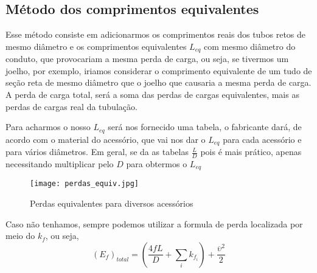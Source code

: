 \subsection{Método dos comprimentos equivalentes}
Esse método consiste em adicionarmos os comprimentos reais dos tubos retos de mesmo diâmetro e os
comprimentos equivalentes \(L_{eq} \) com mesmo diâmetro do conduto, que provocariam a mesma perda
de carga, ou seja, se tivermos um joelho, por exemplo, iriamos considerar o comprimento equivalente
de um tudo de seção reta de mesmo diâmetro que o joelho que causaria a mesma perda de carga. A perda
de carga total, será a soma das perdas de cargas equivalentes, mais as perdas de cargas real da
tubulação. \par Para acharmos o nosso \(L_{eq}\) será nos fornecido uma tabela, o fabricante dará,
de acordo com o material do acessório, que vai nos dar o \(L_{eq}\) para cada acessório e para
vários diâmetros. Em geral, se da as tabelas \(\frac{L}{D}\) pois é mais prático, apenas
necessitando multiplicar pelo \(D\) para obtermos o \(L_{eq} \)
\begin{figure}[H]
    \centering
    \texttt{[image: perdas\_equiv.jpg]}
    \caption{Perdas equivalentes para diversos acessórios}
    \label{fig: perdas_equiv}
\end{figure}
Caso não tenhamos, sempre podemos utilizar a formula de perda localizada por meio do \(k_f\), ou
seja,
\begin{equation}
    (E_f)_{total} = \left( \frac{4fL}{D} + \sum_{i} k_{f_i} \right) + \frac{\overline{\upsilon } ^{2} }{2} 
\end{equation}
